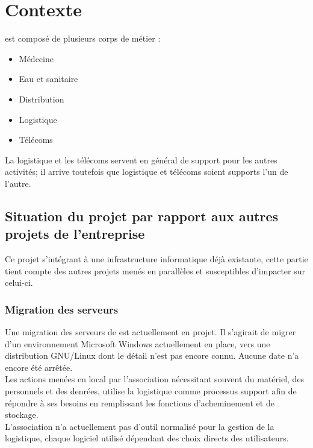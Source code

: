 \section{Contexte}
\mo est composé de plusieurs corps de métier :
\begin{itemize}
	\item Médecine
	\item Eau et sanitaire
	\item Distribution
	\item Logistique
	\item Télécoms
\end{itemize}

La logistique et les télécoms servent en général de support pour les autres activités; il arrive toutefois que logistique et télécoms soient supports l'un de l'autre.

\subsection{Situation du projet par rapport aux autres projets de l'entreprise}
Ce projet s'intégrant à une infrastructure informatique déjà existante, cette partie tient compte des autres projets menés en parallèles et susceptibles d'impacter sur celui-ci.

\subsubsection{Migration des serveurs}
Une migration des serveurs de \mo est actuellement en projet. Il s'agirait de migrer d'un environnement Microsoft Windows actuellement en place, vers une distribution GNU/Linux dont le détail n'est pas encore connu. Aucune date n'a encore été arrêtée.
\\
Les actions menées en local par l'association nécessitant souvent du matériel, des personnels et des denrées,  utilise la logistique comme processus support afin de répondre à ses besoins en remplissant les fonctions d'acheminement et de stockage.
\\
L'association n'a actuellement pas d'outil normalisé pour la gestion de la logistique, chaque logiciel utilisé dépendant des choix directs des utilisateurs.

